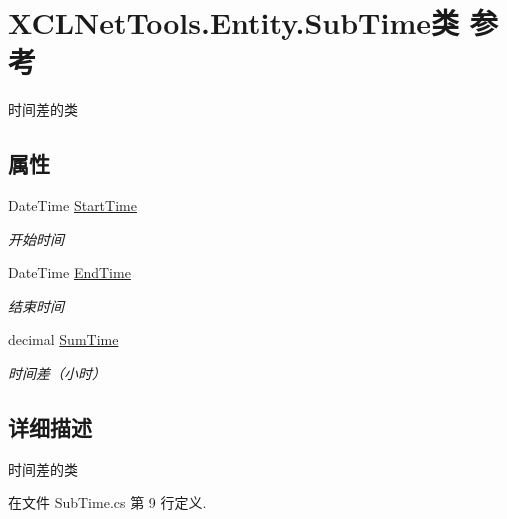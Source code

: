 \hypertarget{class_x_c_l_net_tools_1_1_entity_1_1_sub_time}{\section{X\-C\-L\-Net\-Tools.\-Entity.\-Sub\-Time类 参考}
\label{class_x_c_l_net_tools_1_1_entity_1_1_sub_time}
}


时间差的类  


\subsection*{属性}
\begin{DoxyCompactItemize}
\item 
Date\-Time \hyperlink{class_x_c_l_net_tools_1_1_entity_1_1_sub_time_a7813c7a0874535abbe0b5307d7310c27}{Start\-Time}
\begin{DoxyCompactList}\small\item\em 开始时间 \end{DoxyCompactList}\item 
Date\-Time \hyperlink{class_x_c_l_net_tools_1_1_entity_1_1_sub_time_a286d907d4beb9e6153f1abdb6f2c95fd}{End\-Time}
\begin{DoxyCompactList}\small\item\em 结束时间 \end{DoxyCompactList}\item 
decimal \hyperlink{class_x_c_l_net_tools_1_1_entity_1_1_sub_time_afe5aa74e0038c4b4342be84211c3f607}{Sum\-Time}
\begin{DoxyCompactList}\small\item\em 时间差（小时） \end{DoxyCompactList}\end{DoxyCompactItemize}


\subsection{详细描述}
时间差的类 



在文件 Sub\-Time.\-cs 第 9 行定义.



